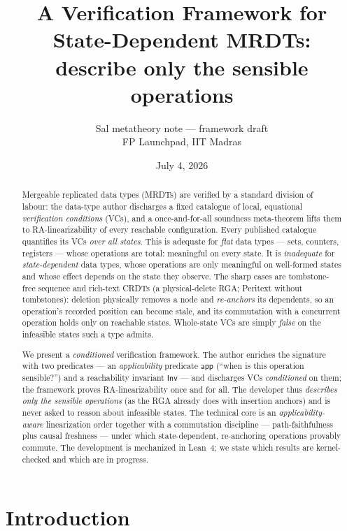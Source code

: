 \documentclass[11pt]{article}
\title{\bfseries A Verification Framework for State-Dependent MRDTs:\\
  \large describe only the sensible operations}
\author{Sal metatheory note --- framework draft\\
  \small FP Launchpad, IIT Madras}
\date{July 4, 2026}
\newcommand{\Inv}{\mathsf{Inv}}
\newcommand{\app}{\mathsf{app}}
\begin{document}
\maketitle

\begin{abstract}
\noindent
Mergeable replicated data types (MRDTs) are verified by a standard division of
labour: the data-type author discharges a fixed catalogue of local, equational
\emph{verification conditions} (VCs), and a once-and-for-all soundness
meta-theorem lifts them to RA-linearizability of every reachable configuration.
Every published catalogue quantifies its VCs \emph{over all states}. This is
adequate for \emph{flat} data types --- sets, counters, registers --- whose
operations are total: meaningful on every state. It is \emph{inadequate} for
\emph{state-dependent} data types, whose operations are only meaningful on
well-formed states and whose effect depends on the state they observe. The
sharp cases are tombstone-free sequence and rich-text CRDTs (a physical-delete
RGA; Peritext without tombstones): deletion physically removes a node and
\emph{re-anchors} its dependents, so an operation's recorded position can become
stale, and its commutation with a concurrent operation holds only on reachable
states. Whole-state VCs are simply \emph{false} on the infeasible states such a
type admits.

We present a \emph{conditioned} verification framework. The author enriches the
signature with two predicates --- an \emph{applicability} predicate $\app$
(``when is this operation sensible?'') and a reachability invariant $\Inv$ ---
and discharges VCs \emph{conditioned} on them; the framework proves
RA-linearizability once and for all. The developer thus \emph{describes only the
sensible operations} (as the RGA already does with insertion anchors) and is
never asked to reason about infeasible states. The technical core is an
\emph{applicability-aware} linearization order together with a commutation
discipline --- path-faithfulness plus causal freshness --- under which
state-dependent, re-anchoring operations provably commute. The development is
mechanized in Lean~4; we state which results are kernel-checked and which are
in progress.
\end{abstract}

\section{Introduction}
\label{sec:intro}
\end{document}
